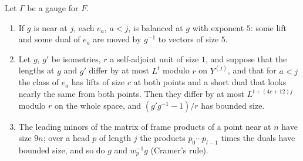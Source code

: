 \begin{proposition}\label{prop:two-gauges}
Let $\Gamma$ be a gauge for $F$.
\begin{enumerate}[label=\textup{(\alph*)}]
\item If $g$ is near at $j$, each $e_a$, $a<j$, is balanced at $g$ with exponent $5$: some lift and some dual of $e_a$ are moved by $g^{-1}$ to vectors of size $5$.
\item Let $g$, $g'$ be isometries, $r$ a self-adjoint unit of size $1$, and suppose that the lengths at $g$ and $g'$ differ by at most $L^t$ modulo $r$ on $Y^{(j)}$, and that for $a<j$ the class of
$e_a$ has lifts of size $c$ at both points and a short dual that looks nearly the same from both points. Then they differ by at most $L^{t+(4c+12)j}$ modulo $r$ on the whole space, and
$(g'g^{-1}-1)/r$ has bounded size.
\item The leading minors of the matrix of frame products of a point near at $n$ have size $9n$; over a head $p$ of length $j$ the products $p_0\cdots p_{l-1}$ times the duals have bounded size,
and so do $g$ and $w_p^{-1}g$ (Cramer's rule).
\end{enumerate}
\end{proposition}

